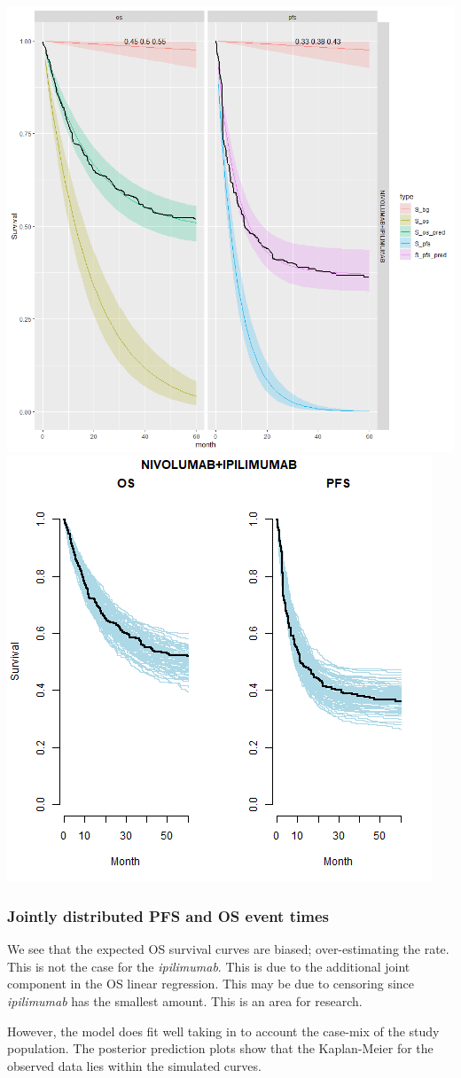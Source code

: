 \documentclass[
]{article}
\begin{document}
\begin{center}\includegraphics[width=0.4\linewidth]{../plots/S_plots_exp_exp_cf_separate_NIVO+IPI} \includegraphics[width=0.4\linewidth]{../plots/post_pred_cfsep_exp_exp_NIVOLUMAB+IPILIMUMAB} \end{center}

\hypertarget{jointly-distributed-pfs-and-os-event-times}{%
\subsubsection{Jointly distributed PFS and OS event
times}\label{jointly-distributed-pfs-and-os-event-times}}

We see that the expected OS survival curves are biased; over-estimating
the rate. This is not the case for the \emph{ipilimumab}. This is due to
the additional joint component in the OS linear regression. This may be
due to censoring since \emph{ipilimumab} has the smallest amount. This
is an area for research.

However, the model does fit well taking in to account the case-mix of
the study population. The posterior prediction plots show that the
Kaplan-Meier for the observed data lies within the simulated curves.
\end{document}
